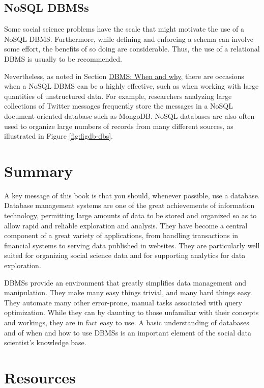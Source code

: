 \documentclass[]{krantz}
\begin{document}
\subsection{NoSQL DBMSs}\label{nosql-dbmss}

Some social science problems have the scale that might motivate the use
of a NoSQL DBMS. Furthermore, while defining and enforcing a schema can
involve some effort, the benefits of so doing are considerable. Thus,
the use of a relational DBMS is usually to be recommended.

Nevertheless, as noted in Section \protect\hyperlink{sec:db:when}{DBMS:
When and why}, there are occasions when a NoSQL DBMS can be a highly
effective, such as when working with large quantities of unstructured
data. For example, researchers analyzing large collections of Twitter
messages frequently store the messages in a NoSQL document-oriented
database such as MongoDB. NoSQL databases are also often used to
organize large numbers of records from many different sources, as
illustrated in Figure \ref{fig:figdb-dbs}.

\section{Summary}\label{summary-2}

A key message of this book is that you should, whenever possible, use a
database. Database management systems are one of the great achievements
of information technology, permitting large amounts of data to be stored
and organized so as to allow rapid and reliable exploration and
analysis. They have become a central component of a great variety of
applications, from handling transactions in financial systems to serving
data published in websites. They are particularly well suited for
organizing social science data and for supporting analytics for data
exploration.

DBMSs provide an environment that greatly simplifies data management and
manipulation. They make many easy things trivial, and many hard things
easy. They automate many other error-prone, manual tasks associated with
query optimization. While they can by daunting to those unfamiliar with
their concepts and workings, they are in fact easy to use. A basic
understanding of databases and of when and how to use DBMSs is an
important element of the social data scientist's knowledge base.

\section{Resources}\label{resources-1}
\end{document}

